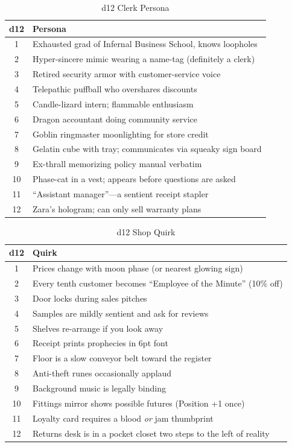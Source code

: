 \begin{table}[h]
\centering
\caption{d12 Clerk Persona}
\label{tab:clerk-persona}
\begin{tabular}{@{}cl@{}}
\toprule
d12 & Persona \\
\midrule
1 & Exhausted grad of Infernal Business School, knows loopholes \\
2 & Hyper-sincere mimic wearing a name-tag (definitely a clerk) \\
3 & Retired security armor with customer-service voice \\
4 & Telepathic puffball who overshares discounts \\
5 & Candle-lizard intern; flammable enthusiasm \\
6 & Dragon accountant doing community service \\
7 & Goblin ringmaster moonlighting for store credit \\
8 & Gelatin cube with tray; communicates via squeaky sign board \\
9 & Ex-thrall memorizing policy manual verbatim \\
10 & Phase-cat in a vest; appears before questions are asked \\
11 & ``Assistant manager''---a sentient receipt stapler \\
12 & Zara's hologram; can only sell warranty plans \\
\bottomrule
\end{tabular}
\end{table}

\begin{table}[h]
\centering
\caption{d12 Shop Quirk}
\label{tab:shop-quirk}
\begin{tabular}{@{}cl@{}}
\toprule
d12 & Quirk \\
\midrule
1 & Prices change with moon phase (or nearest glowing sign) \\
2 & Every tenth customer becomes ``Employee of the Minute'' (10\% off) \\
3 & Door locks during sales pitches \\
4 & Samples are mildly sentient and ask for reviews \\
5 & Shelves re-arrange if you look away \\
6 & Receipt prints prophecies in 6pt font \\
7 & Floor is a slow conveyor belt toward the register \\
8 & Anti-theft runes occasionally applaud \\
9 & Background music is legally binding \\
10 & Fittings mirror shows possible futures (Position +1 once) \\
11 & Loyalty card requires a blood \emph{or} jam thumbprint \\
12 & Returns desk is in a pocket closet two steps to the left of reality \\
\bottomrule
\end{tabular}
\end{table}

